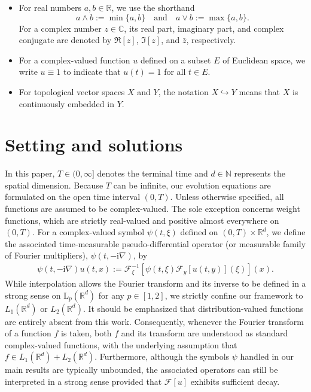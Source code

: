 \documentclass[11pt,reqno]{amsart}
\theoremstyle{definition}
\theoremstyle{remark}
\newcommand\cF{\mathcal{F}}
\numberwithin{equation}{section}
\newcommand{\mysection}[1]{\section{#1}}
\begin{document}
\begin{itemize}
\item For real numbers $a,b \in \mathbb{R}$, we use the shorthand
$$
a \wedge b := \min\{a,b\} \quad \text{and} \quad a \vee b := \max\{a,b\}.
$$
For a complex number $z \in \mathbb{C}$, its real part, imaginary part, and complex conjugate are denoted by $\Re[z]$, $\Im[z]$, and $\bar{z}$, respectively.

\item For a complex-valued function $u$ defined on a subset $E$ of Euclidean space, we write $u \equiv 1$ to indicate that $u(t) = 1$ for all $t \in E$.

\item For topological vector spaces $X$ and $Y$, the notation $X \hookrightarrow Y$ means that $X$ is continuously embedded in $Y$.
\end{itemize}


\mysection{Setting and solutions}
											\label{main section}






In this paper, $T \in (0,\infty]$ denotes the terminal time and $d \in \mathbb{N}$ represents the spatial dimension. 
Because $T$ can be infinite, our evolution equations are formulated on the open time interval $(0,T)$. Unless otherwise specified, all functions are assumed to be complex-valued. 
The sole exception concerns weight functions, which are strictly real-valued and positive almost everywhere on $(0,T)$.
For a complex-valued symbol $\psi(t,\xi)$ defined on $(0,T) \times \mathbb{R}^d$, we define the associated time-measurable pseudo-differential operator (or measurable family of Fourier multipliers), $\psi(t,-\mathrm{i}\nabla)$, by
\begin{align}
									\label{20230522 01}
\psi(t,-\mathrm{i}\nabla)u(t,x):=\cF_\xi^{-1}\left[\psi(t,\xi)\cF_y[u(t,y)](\xi)\right](x).
\end{align}
While interpolation allows the Fourier transform and its inverse to be defined in a strong sense on $\mathrm{L}_p(\mathbb{R}^d)$ for any $p \in [1,2]$, we strictly confine our framework to $L_1(\mathbb{R}^d)$ or $L_2(\mathbb{R}^d)$. 
It should be emphasized that distribution-valued functions are entirely absent from this work. 
Consequently, whenever the Fourier transform of a function $f$ is taken, both $f$ and its transform are understood as standard complex-valued functions, with the underlying assumption that $f \in L_1(\mathbb{R}^d) + L_2(\mathbb{R}^d)$.
Furthermore, although the symbols $\psi$ handled in our main results are typically unbounded, the associated operators can still be interpreted in a strong sense provided that $\mathcal{F}[u]$ exhibits sufficient decay.
\end{document}

